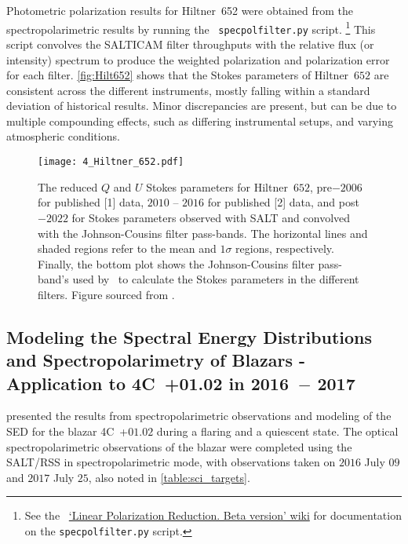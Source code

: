 Photometric polarization results for Hiltner~652 were obtained from the spectro\-polarimetric results by running the \polsalt\ \texttt{specpolfilter.py} script.%
\footnote{See the \polsalt\ \protect\href{https://github.com/saltastro/polsalt/wiki/Linear-Polarization-Reduction.--Beta-version\#7-specpolfilterpy--compute-synthetic-filter-polarization-results-for-listed-filters}{`Linear Polarization Reduction. Beta version' wiki} for documentation on the \texttt{specpolfilter.py} script.}
This script convolves the \gls{SALTICAM} filter throughputs with the relative flux (or intensity) spectrum to produce the weighted polarization and polarization error for each filter.
\autoref{fig:Hilt652} shows that the Stokes parameters of Hiltner~$652$ are consistent across the different instruments, mostly falling within a standard deviation of historical results.
Minor discrepancies are present, but can be due to multiple compounding effects, such as differing instrumental setups, and varying atmospheric conditions.

\begin{figure}[t]
    \centering
    \texttt{[image: 4\_Hiltner\_652.pdf]}
    \caption{
        The reduced $Q$ and $U$ Stokes parameters for Hiltner~$652$, pre$-2006$ for published [1] data, $2010$ -- $2016$ for published [2] data, and post$-2022$ for Stokes parameters observed with \gls{SALT} and convolved with the \gls{Johnson-Cousins} filter pass-bands.
        The horizontal lines and shaded regions refer to the  mean and $1\sigma$ regions, respectively.
        Finally, the bottom plot shows the \gls{Johnson-Cousins} filter pass-band's used by \polsalt\ to calculate the Stokes parameters in the different filters.
        Figure sourced from \citep{Cooper_HEASA2022}.
    }
    \label{fig:Hilt652}
\end{figure}

\subsection[Schutte et al.\ (2022)]{%
    Modeling the Spectral Energy Distributions and Spectro\-polarimetry of Blazars - Application to 4C~+01.02 in 2016~$-$ 2017\\
    \citep{Schutte4C0102}
}

\citet{Schutte4C0102} presented the results from spectropolarimetric observations and modeling of the \gls{SED} for the blazar 4C~+$01.02$ during a flaring and a quiescent state.
The optical spectropolarimetric observations of the blazar were completed using the \gls{SALT}/\gls{RSS} in spectropolarimetric mode, with observations taken on $2016$ July $09$ and $2017$ July $25$, also noted in \autoref{table:sci_targets}.

